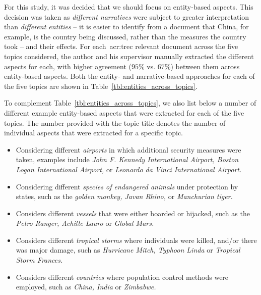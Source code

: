 For this study, it was decided that we should focus on entity-based aspects. This decision was taken as \emph{different narratives} were subject to greater interpretation than \emph{different entities} -- it is easier to identify from a document that China, for example, is the country being discussed, rather than the measures the country took -- and their effects. For each~\gls{acr:trec} relevant document across the five topics considered, the author and his supervisor manually extracted the different aspects for each, with higher agreement ($95\%$ vs. $67\%$) between them across entity-based aspects. Both the entity- and narrative-based approaches for each of the five topics are shown in Table~\ref{tbl:entities_across_topics}.

To complement Table~\ref{tbl:entities_across_topics}, we also list below a number of different example entity-based aspects that were extracted for each of the five topics. The number provided with the topic title denotes the number of individual aspects that were extracted for a specific topic.

\begin{itemize}
    \item{ Considering different \emph{airports} in which additional security measures were taken, examples include \emph{John F. Kennedy International Airport, Boston Logan International Airport,} or \emph{Leonardo da Vinci International Airport.}}
    \item{ Considering different \emph{species of endangered animals} under protection by states, such as the \emph{golden monkey, Javan Rhino,} or \emph{Manchurian tiger.}}
    \item{ Considers different \emph{vessels} that were either boarded or hijacked, such as the \emph{Petro Ranger, Achille Lauro} or \emph{Global Mars.}}
    \item{ Considers different \emph{tropical storms} where individuals were killed, and/or there was major damage, such as \emph{Hurricane Mitch, Typhoon Linda} or \emph{Tropical Storm Frances.}}
    \item{ Considers different \emph{countries} where population control methods were employed, such as \emph{China, India} or \emph{Zimbabwe.}}
\end{itemize}

